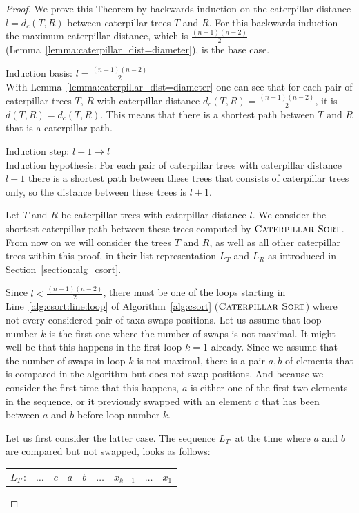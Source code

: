 \documentclass{amsart}
\newcommand{\csort}{\textsc{Caterpillar Sort}}
\begin{document}
\begin{proof}
We prove this Theorem by backwards induction on the caterpillar distance $l = d_c(T,R)$ between caterpillar trees $T$ and $R$.
For this backwards induction the maximum caterpillar distance, which is $\frac{(n-1)(n-2)}{2}$ (Lemma~\ref{lemma:caterpillar_dist=diameter}), is the base case.

Induction basis: $l = \frac{(n-1)(n-2)}{2}$\\
With Lemma~\ref{lemma:caterpillar_dist=diameter} one can see that for each pair of caterpillar trees $T$, $R$ with caterpillar distance $d_c(T,R) = \frac{(n-1)(n-2)}{2}$, it is $d(T,R) = d_c(T,R)$.
This means that there is a shortest path between $T$ and $R$ that is a caterpillar path.

Induction step: $l+1 \to l$\\
Induction hypothesis: For each pair of caterpillar trees with caterpillar distance $l+1$ there is a shortest path between these trees that consists of caterpillar trees only, so the distance between these trees is $l+1$.

Let $T$ and $R$ be caterpillar trees with caterpillar distance $l$.
We consider the shortest caterpillar path between these trees computed by $\csort$.
From now on we will consider the trees $T$ and $R$, as well as all other caterpillar trees within this proof, in their list representation $L_T$ and $L_R$ as introduced in Section~\ref{section:alg_csort}.

Since $l < \frac{(n-1)(n-2)}{2}$, there must be one of the loops starting in Line~\ref{alg:csort:line:loop} of Algorithm~\ref{alg:csort} ($\csort$) where not every considered pair of taxa swaps positions.
Let us assume that loop number $k$ is the first one where the number of swaps is not maximal.
It might well be that this happens in the first loop $k=1$ already.
Since we assume that the number of swaps in loop $k$ is not maximal, there is a pair $a,b$ of elements that is compared in the algorithm but does not swap positions.
And because we consider the first time that this happens, $a$ is either one of the first two elements in the sequence, or it previously swapped with an element $c$ that has been between $a$ and $b$ before loop number $k$.

Let us first consider the latter case.
The sequence $L_{T'}$ at the time where $a$ and $b$ are compared but not swapped, looks as follows:

\vspace{12pt}
\begin{tabular}{c|c|c|c|c|c|c|c|c|}
\cline{2-9}
$L_{T'}$: & $\ldots$ & $c$ & $a$ & $b$ & $\ldots$& $x_{k-1}$ & $\ldots$ & $x_1$\\
\cline{2-9}
\end{tabular}
\vspace{12pt}


\end{proof}
\end{document}
